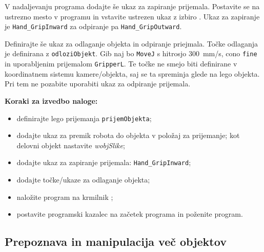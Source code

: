 V nadaljevanju programa dodajte še ukaz za zapiranje prijemala. Postavite se na ustrezno mesto v programu in vstavite ustrezen ukaz z izbiro . Ukaz za zapiranje je \verb"Hand_GripInward" za odpiranje pa \verb"Hand_GripOutward".




Definirajte še ukaz za odlaganje objekta in odpiranje priejmala. Točke odlaganja je definirana z \verb"odloziObjekt". Gib naj bo \verb"MoveJ" s hitrosjo 300~mm/s, cono \verb"fine" in uporabljenim prijemalom \verb"GripperL". Te točke ne smejo biti definirane v koordinatnem sistemu kamere/objekta, saj se ta spreminja glede na lego objekta. Pri tem ne pozabite uporabiti ukaz za odpiranje prijemala.


\vspace{5mm}

\begin{mdframed}[backgroundcolor=yellow!20, shadow=true,roundcorner=8pt]
\textbf{Koraki za izvedbo naloge:}
\begin{itemize}
  \item definirajte lego prijemanja \verb"prijemObjekta";
  \item dodajte ukaz za premik robota do objekta v položaj za prijemanje; kot delovni objekt nastavite \emph{wobjSlike};
  \item dodajte ukaz za zapiranje prijemala: \verb"Hand_GripInward";
  \item dodajte točke/ukaze za odlaganje objekta;
  \item naložite program na krmilnik ;
  \item postavite programski kazalec na začetek programa in poženite program.
\end{itemize}
\end{mdframed}


\subsection{Prepoznava in manipulacija več objektov}

